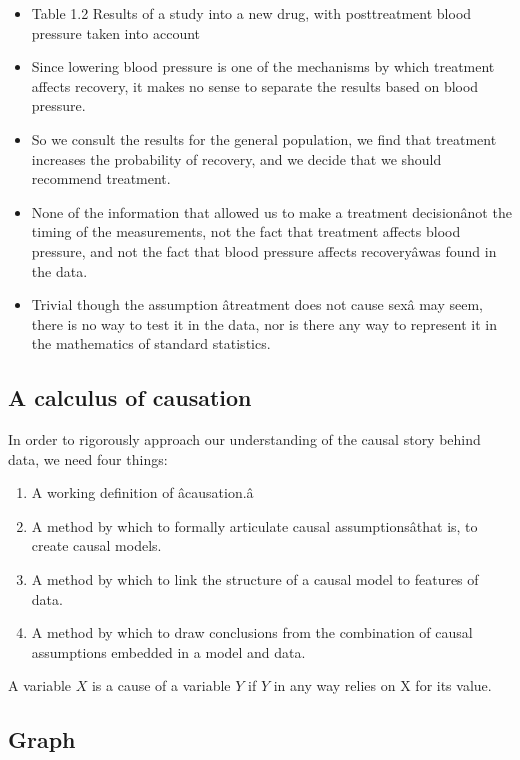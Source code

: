 \documentclass[]{article}
\providecommand{\tightlist}{%
  \setlength{\itemsep}{0pt}\setlength{\parskip}{0pt}}
\begin{document}
\begin{itemize}
\item
  Table 1.2 Results of a study into a new drug, with posttreatment blood
  pressure taken into account
\item
  Since lowering blood pressure is one of the mechanisms by which
  treatment affects recovery, it makes no sense to separate the results
  based on blood pressure.
\item
  So we consult the results for the general population, we find that
  treatment increases the probability of recovery, and we decide that we
  should recommend treatment.
\item
  None of the information that allowed us to make a treatment
  decisionânot the timing of the measurements, not the fact that
  treatment affects blood pressure, and not the fact that blood pressure
  affects recoveryâwas found in the data.
\item
  Trivial though the assumption âtreatment does not cause sexâ may
  seem, there is no way to test it in the data, nor is there any way to
  represent it in the mathematics of standard statistics.
\end{itemize}

\subsection{A calculus of causation}\label{a-calculus-of-causation}

In order to rigorously approach our understanding of the causal story
behind data, we need four things:

\begin{enumerate}
\def\labelenumi{\arabic{enumi}.}
\tightlist
\item
  A working definition of âcausation.â
\item
  A method by which to formally articulate causal assumptionsâthat is,
  to create causal models.
\item
  A method by which to link the structure of a causal model to features
  of data.
\item
  A method by which to draw conclusions from the combination of causal
  assumptions embedded in a model and data.
\end{enumerate}

A variable \(X\) is a cause of a variable \(Y\) if \(Y\) in any way
relies on X for its value.

\subsection{Graph}\label{graph}
\end{document}
